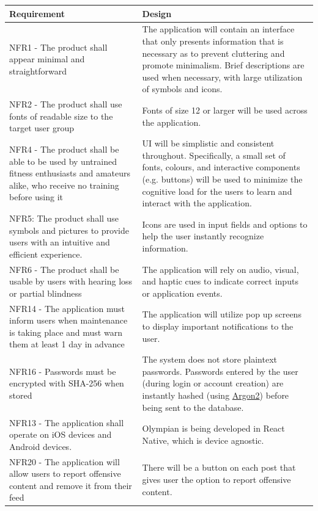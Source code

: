 \documentclass[12pt, titlepage]{article}
\begin{document}
\begin{tabular}{ | m{20em} | m{20em} | }
		\hline
		Requirement & Design \\
		\hline
		NFR1 - The product shall appear minimal and straightforward & The application will contain an interface that only presents information that is necessary as to prevent cluttering and promote minimalism. Brief descriptions are used when necessary, with large utilization of symbols and icons. \\
		\hline
		NFR2 - The product shall use fonts of readable size to the target user group & Fonts of size 12 or larger will be used across the application. \\
		\hline
		NFR4 - The product shall be able to be used by untrained fitness enthusiasts and amateurs alike, who receive no training before using it & UI will be simplistic and consistent throughout. Specifically, a small set of fonts, colours, and interactive components (e.g. buttons) will be used to minimize the cognitive load for the users to learn and interact with the application. \\
		\hline
		NFR5: The product shall use symbols and pictures to provide users with an intuitive and
		efficient experience. & Icons are used in input fields and options to help the user instantly recognize information. \\
		\hline
		NFR6 - The product shall be usable by users with hearing loss or partial blindness & The application will rely on audio, visual, and haptic cues to indicate correct inputs or application events. \\
		\hline
		NFR14 - The application must inform users when maintenance is taking place and must warn them at least 1 day in advance & The application will utilize pop up screens to display important notifications to the user. \\
		\hline
		NFR16 - Passwords must be encrypted with SHA-256 when stored & The system does not store plaintext passwords. Passwords entered by the user (during login or account creation) are instantly hashed (using \href{https://argon2.online/}{Argon2}) before being sent to the database. \\
		\hline
		NFR13 - The application shall operate on iOS devices and Android devices. & Olympian is being developed in React Native, which is device agnostic. \\
		\hline
		NFR20 - The application will allow users to report offensive content and remove it from their feed & There will be a button on each post that gives user the option to report offensive content. \\
		\hline

	\end{tabular}
	
\end{document}
